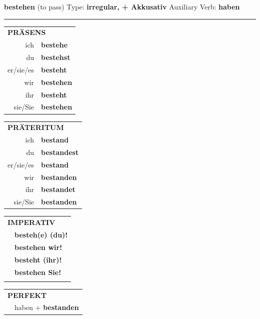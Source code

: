 \documentclass[10pt,a4paper]{revtex4-2}
\begin{document}
\begin{verbbox-acc}
    {\Large \bf bestehen} (to pass) \hfill Type: \textbf{irregular, + Akkusativ} \hfill Auxiliary Verb: \textbf{haben} 
    
     \vspace{5pt}

    \hrule
    
    \vspace{5pt}

  \begin{tabular}{rl}
     \multicolumn{2}{l}{\textbf{PRÄSENS} }\\
    ich & \textbf{bestehe}\\
    du & \textbf{bestehst}\\
    er/sie/es & \textbf{besteht}\\
    wir & \textbf{bestehen}\\
    ihr & \textbf{besteht}\\
    sie/Sie & \textbf{bestehen}\\
  \end{tabular}
  \hfill
     \begin{tabular}{rl}
    \multicolumn{2}{l}{\textbf{PRÄTERITUM} }\\
    ich & \textbf{bestand}\\
    du & \textbf{bestandest}\\
    er/sie/es & \textbf{bestand}\\
    wir & \textbf{bestanden}\\
    ihr & \textbf{bestandet}\\
    sie/Sie & \textbf{bestanden}\\
  \end{tabular}
  \hfill
  \begin{tabular}{rl}
     \multicolumn{2}{l}{\textbf{IMPERATIV} }\\
   & \textbf{besteh(e) (du)!}\\
   & \textbf{bestehen wir!}\\
   & \textbf{besteht (ihr)!}\\
   & \textbf{bestehen Sie!}\\
   & \vspace{10pt}
  \end{tabular}

    \vspace{10pt}

 \begin{tabular}{rl}
     \multicolumn{2}{l}{\textbf{PERFEKT}}\\
  &  haben + \textbf{bestanden}\\
  \end{tabular}
\hfill
   \begin{tabular}{rl}
   

\end{tabular}
\end{verbbox-acc}
\end{document}
